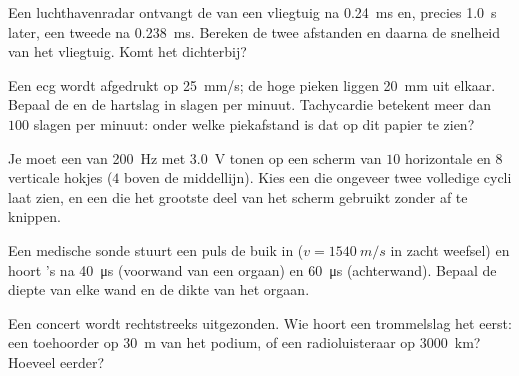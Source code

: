 \begin{exercise}[$\star\star$]\label{exo:g10:signals-and-waves:7}
Een luchthavenradar ontvangt de  van een vliegtuig na \qty{0.24}{ms}
en, precies \qty{1.0}{s} later, een tweede  na \qty{0.238}{ms}.
Bereken de twee afstanden en daarna de snelheid van het vliegtuig. Komt
het dichterbij?
\end{exercise}

\begin{exercise}[$\star\star$]\label{exo:g10:signals-and-waves:8}
Een ecg wordt afgedrukt op \qty{25}{mm/s}; de hoge pieken liggen
\qty{20}{mm} uit elkaar. Bepaal de  en de hartslag in slagen per
minuut. Tachycardie betekent meer dan $100$ slagen per minuut: onder
welke piekafstand is dat op dit papier te zien?
\end{exercise}

\begin{exercise}[$\star\star$]\label{exo:g10:signals-and-waves:9}
Je moet een  van \qty{200}{Hz} met  \qty{3.0}{V} tonen op
een scherm van $10$ horizontale en $8$ verticale hokjes ($4$ boven de
middellijn). Kies een  die ongeveer twee volledige cycli laat
zien, en een  die het grootste deel van het scherm gebruikt
zonder af te knippen.
\end{exercise}

\begin{exercise}[$\star\star$]\label{exo:g10:signals-and-waves:10}
Een medische sonde stuurt een puls  de buik in
($v = \qty{1540}{m/s}$ in zacht weefsel) en hoort 's na
\qty{40}{\micro s} (voorwand van een orgaan) en \qty{60}{\micro s}
(achterwand). Bepaal de diepte van elke wand en de dikte van het orgaan.
\end{exercise}

\begin{exercise}[$\star\star$]\label{exo:g10:signals-and-waves:11}
Een concert wordt rechtstreeks uitgezonden. Wie hoort een trommelslag
het eerst: een toehoorder op \qty{30}{m} van het podium, of een
radioluisteraar op \qty{3000}{km}? Hoeveel eerder?
\end{exercise}

